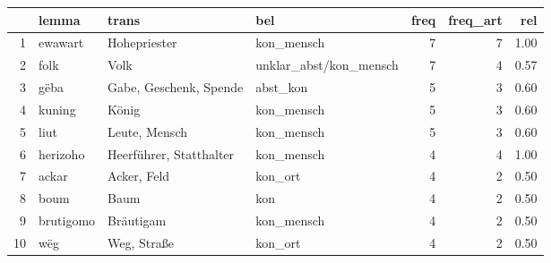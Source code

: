 \begin{tabular}{rlllrrr}
  \hline
 & lemma & trans & bel & freq & freq\_art & rel \\ 
  \hline
1 & ewawart & Hohepriester & kon\_mensch &   7 &   7 & 1.00 \\ 
  2 & folk & Volk & unklar\_abst/kon\_mensch &   7 &   4 & 0.57 \\ 
  3 & gëba & Gabe, Geschenk, Spende & abst\_kon &   5 &   3 & 0.60 \\ 
  4 & kuning & König & kon\_mensch &   5 &   3 & 0.60 \\ 
  5 & liut & Leute, Mensch & kon\_mensch &   5 &   3 & 0.60 \\ 
  6 & herizoho & Heerführer, Statthalter & kon\_mensch &   4 &   4 & 1.00 \\ 
  7 & ackar & Acker, Feld & kon\_ort &   4 &   2 & 0.50 \\ 
  8 & boum & Baum & kon &   4 &   2 & 0.50 \\ 
  9 & brutigomo & Bräutigam & kon\_mensch &   4 &   2 & 0.50 \\ 
  10 & wëg & Weg, Straße & kon\_ort &   4 &   2 & 0.50 \\ 
   \hline
\end{tabular}
